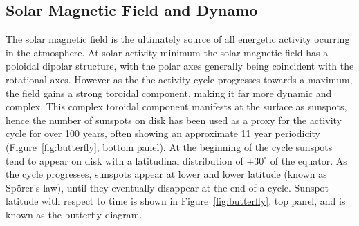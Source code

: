 




\subsection{Solar Magnetic Field and Dynamo}\label{sec:11}

The solar magnetic field is the ultimately source of all energetic activity ocurring in the atmosphere. At solar activity minimum the solar magnetic field has a poloidal dipolar structure, with the polar axes generally being coincident with the rotational axes. However as the the activity cycle progresses towards a maximum, the field gains a strong toroidal component, making it far more dynamic and complex. This complex toroidal component manifests at the surface as sunspots, hence the number of sunspots on disk has been used as a proxy for the activity cycle for over 100 years, often showing an approximate 11 year periodicity (Figure~\ref{fig:butterfly}, bottom panel). At the beginning of the cycle sunspots tend to appear on disk with a latitudinal distribution of $\pm30^{\circ}$ of the equator. As the cycle progresses, sunspots appear at lower and lower latitude (known as Sp\"{o}rer's law), until they eventually disappear at the end of a cycle. Sunspot latitude with respect to time is shown in Figure~\ref{fig:butterfly}, top panel, and is known as the butterfly diagram.

